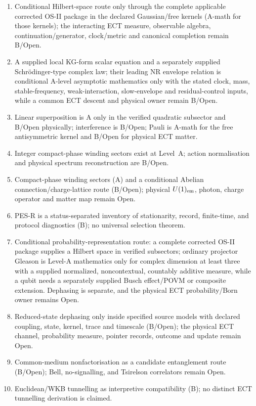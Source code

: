 \documentclass[11pt,a4paper]{article}
\begin{document}
\begin{enumerate}
\item Conditional Hilbert-space route only through the complete applicable corrected OS-II package in the declared Gaussian/free kernels (A-math for those kernels); the interacting ECT measure, observable algebra, continuation/generator, clock/metric and canonical completion remain B/Open.
\item A supplied local KG-form scalar equation and a separately supplied Schr\"odinger-type complex law; their leading NR envelope relation is conditional A-level asymptotic mathematics only with the stated clock, mass, stable-frequency, weak-interaction, slow-envelope and residual-control inputs, while a common ECT descent and physical owner remain B/Open.
\item Linear superposition is A only in the verified quadratic subsector and B/Open physically; interference is B/Open; Pauli is A-math for the free antisymmetric kernel and B/Open for physical ECT matter.
\item Integer compact-phase winding sectors exist at Level~A; action normalisation and physical spectrum reconstruction are B/Open.
\item Compact-phase winding sectors (A) and a conditional Abelian connection/charge-lattice route (B/Open); physical $U(1)_{\rm em}$, photon, charge operator and matter map remain Open.
\item PES-R is a status-separated inventory of stationarity, record, finite-time, and protocol diagnostics (B); no universal selection theorem.
\item Conditional probability-representation route: a complete corrected OS-II package supplies a Hilbert space in verified subsectors; ordinary projector Gleason is Level-A mathematics only for complex dimension at least three with a supplied normalized, noncontextual, countably additive measure, while a qubit needs a separately supplied Busch effect/POVM or composite extension.  Dephasing is separate, and the physical ECT probability/Born owner remains Open.
\item Reduced-state dephasing only inside specified source models with declared coupling, state, kernel, trace and timescale (B/Open); the physical ECT channel, probability measure, pointer records, outcome and update remain Open.
\item Common-medium nonfactorisation as a candidate entanglement route (B/Open); Bell, no-signalling, and Tsirelson correlators remain Open.
\item Euclidean/WKB tunnelling as interpretive compatibility (B); no distinct ECT tunnelling derivation is claimed.

\end{enumerate}
\end{document}
